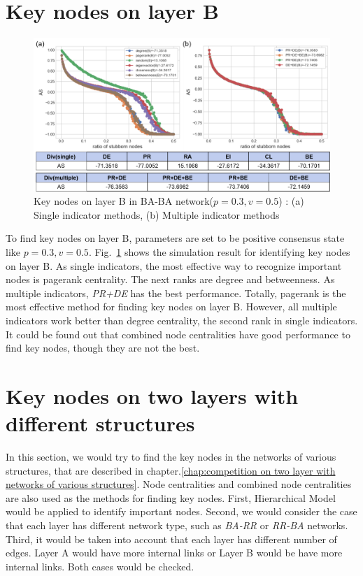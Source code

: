 \section{Key nodes on layer B}
\begin{figure}[!htb]
	\centering
	\includegraphics[width=\hsize]{figure/chap5_keynode_B.png}
	\caption{Key nodes on layer B in BA-BA network($p=0.3, v=0.5$) : (a) Single indicator methods, (b) Multiple indicator methods}
	\label{chap5_keynode_B}
\end{figure}

To find key nodes on layer B, parameters are set to be positive consensus state like $p=0.3, v=0.5$. Fig.~\ref{chap5_keynode_B} shows the simulation result for identifying key nodes on layer B. As single indicators, the most effective way to recognize important nodes is pagerank centrality. The next ranks are degree and betweenness. As multiple indicators, \textit{PR+DE} has the best performance. Totally, pagerank is the most effective method for finding key nodes on layer B. However, all multiple indicators work better than degree centrality, the second rank in single indicators. It could be found out that combined node centralities have good performance to find key nodes, though they are not the best. 

\section{Key nodes on two layers with different structures}
In this section, we would try to find the key nodes in the networks of various structures, that are described in chapter.\ref{chap:competition on two layer with networks of various structures}. Node centralities and combined node centralities are also used as the methods for finding key nodes. First, Hierarchical Model would be applied to identify important nodes. Second, we would consider the case that each layer has different network type, such as \textit{BA-RR} or \textit{RR-BA} networks. Third, it would be taken into account that each layer has different number of edges. Layer A would have more internal links or Layer B would be have more internal links. Both cases would be checked. 

